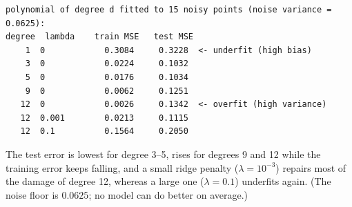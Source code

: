 \documentclass[10pt,a4paper,openany,oneside]{report}
\begin{document}
\begin{lstlisting}[style=out,basicstyle=\ttfamily\fontsize{7.2}{8.6}\selectfont,title={Captured output}]
polynomial of degree d fitted to 15 noisy points (noise variance = 0.0625):
degree  lambda    train MSE   test MSE
    1  0            0.3084     0.3228  <- underfit (high bias)
    3  0            0.0224     0.1032
    5  0            0.0176     0.1034
    9  0            0.0062     0.1251
   12  0            0.0026     0.1342  <- overfit (high variance)
   12  0.001        0.0213     0.1115
   12  0.1          0.1564     0.2050
\end{lstlisting}
The test error is lowest for degree 3--5, rises for degrees 9 and 12 while the training error keeps falling, and a small ridge penalty ($\lambda=10^{-3}$) repairs most of the damage of degree 12, whereas a large one ($\lambda=0.1$) underfits again. (The noise floor is $0.0625$; no model can do better on average.)
\end{document}
